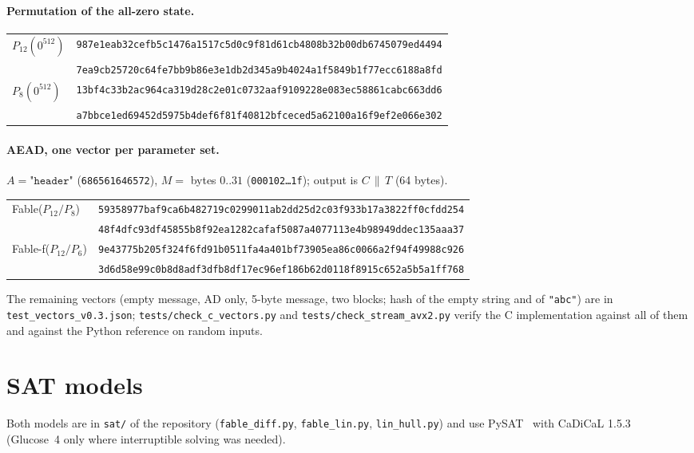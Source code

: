 \documentclass{iacrtrans}
\newcommand{\Fable}{\textsf{Fable}\xspace}
\newcommand{\FableF}{\textsf{Fable-f}\xspace}
\newcommand{\PP}[1]{P_{#1}}
\begin{document}
\paragraph{Permutation of the all-zero state.}
\begin{center}\small
\begin{tabular}{ll}
\toprule
$\PP{12}(0^{512})$ & \texttt{987e1eab32cefb5c1476a1517c5d0c9f81d61cb4808b32b00db6745079ed4494}\\
                   & \texttt{7ea9cb25720c64fe7bb9b86e3e1db2d345a9b4024a1f5849b1f77ecc6188a8fd}\\
$\PP{8}(0^{512})$  & \texttt{13bf4c33b2ac964ca319d28c2e01c0732aaf9109228e083ec58861cabc663dd6}\\
                   & \texttt{a7bbce1ed69452d5975b4def6f81f40812bfceced5a62100a16f9ef2e066e302}\\
\bottomrule
\end{tabular}
\end{center}

\paragraph{AEAD, one vector per parameter set.} $A = \texttt{"header"}$ (\texttt{686561646572}), $M = $ bytes $0..31$ (\texttt{000102\ldots1f}); output is $C \,\|\, T$ (64 bytes).
\begin{center}\small
\begin{tabular}{ll}
\toprule
\Fable ($\PP{12}/\PP{8}$) & \texttt{59358977baf9ca6b482719c0299011ab2dd25d2c03f933b17a3822ff0cfdd254}\\
 & \texttt{48f4dfc93df45855b8f92ea1282cafaf5087a4077113e4b98949ddec135aaa37}\\
\FableF ($\PP{12}/\PP{6}$) & \texttt{9e43775b205f324f6fd91b0511fa4a401bf73905ea86c0066a2f94f49988c926}\\
 & \texttt{3d6d58e99c0b8d8adf3dfb8df17ec96ef186b62d0118f8915c652a5b5a1ff768}\\
\bottomrule
\end{tabular}
\end{center}
The remaining vectors (empty message, AD only, 5-byte message, two blocks; hash of the empty string and of \texttt{"abc"}) are in \texttt{test\_vectors\_v0.3.json}; \texttt{tests/check\_c\_vectors.py} and \texttt{tests/check\_stream\_avx2.py} verify the C implementation against all of them and against the Python reference on random inputs.
\section{SAT models}
\label{app:sat}
Both models are in \texttt{sat/} of the repository (\texttt{fable\_diff.py}, \texttt{fable\_lin.py}, \texttt{lin\_hull.py}) and use PySAT~\cite{PySAT18} with CaDiCaL 1.5.3~\cite{CaDiCaL} (Glucose~4 only where interruptible solving was needed).
\end{document}
